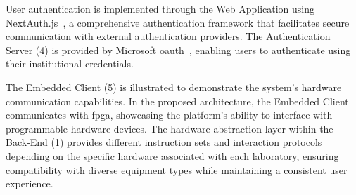 User authentication is implemented through the Web Application using NextAuth.js~\cite{nextjs-authentication}, a comprehensive authentication framework that facilitates secure communication with external authentication providers. The Authentication Server (4) is provided by Microsoft \ac{oauth}~\cite{microsoft-oauth}, enabling users to authenticate using their institutional credentials.

The Embedded Client (5) is illustrated to demonstrate the system's hardware communication capabilities. In the proposed architecture, the Embedded Client communicates with \ac{fpga}, showcasing the platform's ability to interface with programmable hardware devices. The hardware abstraction layer within the Back-End (1) provides different instruction sets and interaction protocols depending on the specific hardware associated with each laboratory, ensuring compatibility with diverse equipment types while maintaining a consistent user experience.
